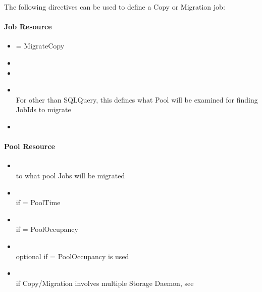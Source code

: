 The following directives can be used to define a Copy or Migration job:

\paragraph{Job Resource}

\begin{itemize}
    \item {} = Migrate{\textbar}Copy
    \item {}
        \item {}
    \item {} \\
        For  other than SQLQuery, 
        this defines what Pool will be examined for finding JobIds to migrate
    \item {}
\end{itemize}

\paragraph{Pool Resource}

\begin{itemize}
    \item {} \\
        to what pool Jobs will be migrated
    \item {} \\
        if  = PoolTime
    \item {} \\
        if  = PoolOccupancy
    \item {} \\
        optional if  = PoolOccupancy is used
    \item {} \\
        if Copy/Migration involves multiple Storage Daemon, see 
\end{itemize}


